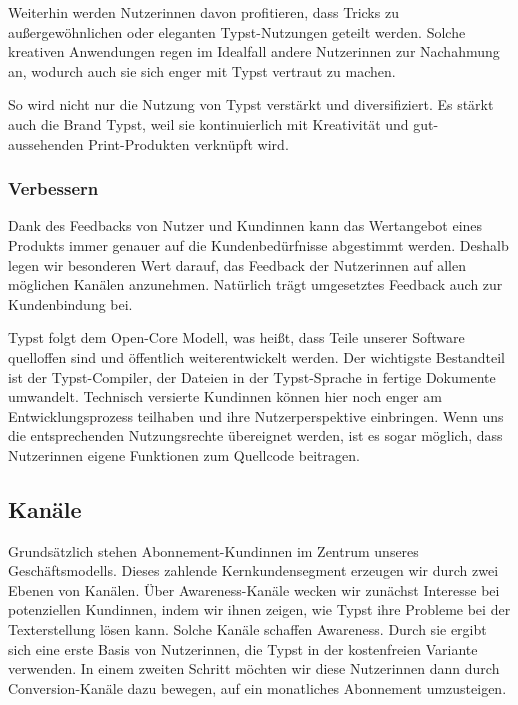 \documentclass[11pt, a4paper]{article}
\newcommand{\gender}{\raisebox{-.25em}{*}}
\renewcommand{\glossary} {\marginsymbol{$\hookrightarrow$}}
\newcommand{\marginsymbol}[1] {\protect\marginsymbolhelper{#1}}
\newcommand{\marginsymbolhelper}[1] {\tabto*{-1cm}\makebox[0cm]{#1}\tabto*{\TabPrevPos}}
\begin{document}
Weiterhin werden Nutzer\gender{}innen davon profitieren, dass Tricks zu außergewöhnlichen oder eleganten Typst-Nutzungen geteilt werden. Solche kreativen Anwendungen regen im Idealfall andere Nutzer\gender{}innen zur Nachahmung an, wodurch auch sie sich enger mit Typst vertraut zu machen.

So wird nicht nur die Nutzung von Typst verstärkt und diversifiziert. Es stärkt auch die Brand Typst, weil sie kontinuierlich mit Kreativität und gut-aussehenden Print-Produkten verknüpft wird.

\subsubsection*{Verbessern}

Dank des Feedbacks von Nutzer\gender{} und Kund\gender{}innen kann das Wertangebot eines Produkts immer genauer auf die Kundenbedürfnisse abgestimmt werden. Deshalb legen wir besonderen Wert darauf, das Feedback der Nutzer\gender{}innen auf allen möglichen Kanälen anzunehmen. Natürlich trägt umgesetztes Feedback auch zur Kundenbindung bei.

Typst folgt dem Open-Core Modell, was heißt, dass Teile unserer Software quelloffen sind und öffentlich weiterentwickelt werden. Der wichtigste Bestandteil ist der \glossary Typst-Compiler, der Dateien in der Typst-Sprache in fertige Dokumente umwandelt. Technisch versierte Kund\gender{}innen können hier noch enger am Entwicklungsprozess teilhaben und ihre Nutzerperspektive einbringen. Wenn uns die entsprechenden Nutzungsrechte übereignet werden, ist es sogar möglich, dass Nutzer\gender{}innen eigene Funktionen zum Quellcode beitragen.


\newpage
\subsection*{Kanäle}

Grundsätzlich stehen Abonnement-Kund\gender{}innen im Zentrum unseres Geschäftsmodells. Dieses zahlende Kernkundensegment erzeugen wir durch zwei Ebenen von Kanälen. Über Awareness-Kanäle wecken wir zunächst Interesse bei potenziellen Kund\gender{}innen, indem wir ihnen zeigen, wie Typst ihre Probleme bei der Texterstellung lösen kann. Solche Kanäle schaffen Awareness. Durch sie ergibt sich eine erste Basis von Nutzer\gender{}innen, die Typst in der kostenfreien Variante verwenden. In einem zweiten Schritt möchten wir diese Nutzer\gender{}innen dann durch Conversion-Kanäle dazu bewegen, auf ein monatliches Abonnement umzusteigen.
\end{document}
